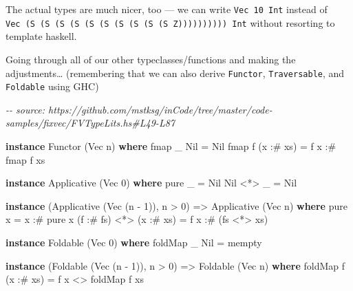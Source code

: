 \documentclass[]{article}
\newenvironment{Shaded}{}{}
\newcommand{\CommentTok}[1]{\textcolor[rgb]{0.38,0.63,0.69}{\textit{#1}}}
\newcommand{\DataTypeTok}[1]{\textcolor[rgb]{0.56,0.13,0.00}{#1}}
\newcommand{\DecValTok}[1]{\textcolor[rgb]{0.25,0.63,0.44}{#1}}
\newcommand{\FunctionTok}[1]{\textcolor[rgb]{0.02,0.16,0.49}{#1}}
\newcommand{\KeywordTok}[1]{\textcolor[rgb]{0.00,0.44,0.13}{\textbf{#1}}}
\newcommand{\NormalTok}[1]{#1}
\newcommand{\OperatorTok}[1]{\textcolor[rgb]{0.40,0.40,0.40}{#1}}
\newcommand{\OtherTok}[1]{\textcolor[rgb]{0.00,0.44,0.13}{#1}}
\begin{document}
The actual types are much nicer, too --- we can write \texttt{Vec\ 10\ Int}
instead of
\texttt{Vec\ (S\ (S\ (S\ (S\ (S\ (S\ (S\ (S\ (S\ (S\ Z))))))))))\ Int} without
resorting to template haskell.

Going through all of our other typeclasses/functions and making the
adjustments\ldots{} (remembering that we can also derive \texttt{Functor},
\texttt{Traversable}, and \texttt{Foldable} using GHC)

\begin{Shaded}
\begin{Highlighting}[]
\CommentTok{{-}{-} source: https://github.com/mstksg/inCode/tree/master/code{-}samples/fixvec/FVTypeLits.hs\#L49{-}L87}

\KeywordTok{instance} \DataTypeTok{Functor}\NormalTok{ (}\DataTypeTok{Vec}\NormalTok{ n) }\KeywordTok{where}
    \FunctionTok{fmap}\NormalTok{ \_ }\DataTypeTok{Nil}       \OtherTok{=} \DataTypeTok{Nil}
    \FunctionTok{fmap}\NormalTok{ f (x }\OperatorTok{:\#}\NormalTok{ xs) }\OtherTok{=}\NormalTok{ f x }\OperatorTok{:\#} \FunctionTok{fmap}\NormalTok{ f xs}

\KeywordTok{instance} \DataTypeTok{Applicative}\NormalTok{ (}\DataTypeTok{Vec} \DecValTok{0}\NormalTok{) }\KeywordTok{where}
    \FunctionTok{pure}\NormalTok{ \_    }\OtherTok{=} \DataTypeTok{Nil}
    \DataTypeTok{Nil} \OperatorTok{<*>}\NormalTok{ \_ }\OtherTok{=} \DataTypeTok{Nil}

\KeywordTok{instance}\NormalTok{ (}\DataTypeTok{Applicative}\NormalTok{ (}\DataTypeTok{Vec}\NormalTok{ (n }\OperatorTok{{-}} \DecValTok{1}\NormalTok{)), n }\OperatorTok{>} \DecValTok{0}\NormalTok{) }\OtherTok{=>} \DataTypeTok{Applicative}\NormalTok{ (}\DataTypeTok{Vec}\NormalTok{ n) }\KeywordTok{where}
    \FunctionTok{pure}\NormalTok{ x }\OtherTok{=}\NormalTok{ x }\OperatorTok{:\#} \FunctionTok{pure}\NormalTok{ x}
\NormalTok{    (f }\OperatorTok{:\#}\NormalTok{ fs) }\OperatorTok{<*>}\NormalTok{ (x }\OperatorTok{:\#}\NormalTok{ xs) }\OtherTok{=}\NormalTok{ f x }\OperatorTok{:\#}\NormalTok{ (fs }\OperatorTok{<*>}\NormalTok{ xs)}

\KeywordTok{instance} \DataTypeTok{Foldable}\NormalTok{ (}\DataTypeTok{Vec} \DecValTok{0}\NormalTok{) }\KeywordTok{where}
    \FunctionTok{foldMap}\NormalTok{ \_ }\DataTypeTok{Nil} \OtherTok{=} \FunctionTok{mempty}

\KeywordTok{instance}\NormalTok{ (}\DataTypeTok{Foldable}\NormalTok{ (}\DataTypeTok{Vec}\NormalTok{ (n }\OperatorTok{{-}} \DecValTok{1}\NormalTok{)), n }\OperatorTok{>} \DecValTok{0}\NormalTok{) }\OtherTok{=>} \DataTypeTok{Foldable}\NormalTok{ (}\DataTypeTok{Vec}\NormalTok{ n) }\KeywordTok{where}
    \FunctionTok{foldMap}\NormalTok{ f (x }\OperatorTok{:\#}\NormalTok{ xs) }\OtherTok{=}\NormalTok{ f x }\OperatorTok{<>} \FunctionTok{foldMap}\NormalTok{ f xs}


\end{Highlighting}
\end{Shaded}
\end{document}
